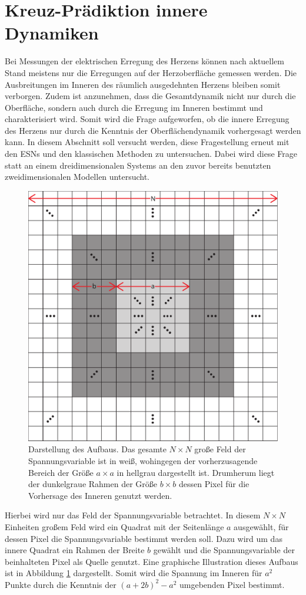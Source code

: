 \clearpage
\section{Kreuz-Prädiktion innere Dynamiken}
\label{sec:exp_inner_prediction}
Bei Messungen der elektrischen Erregung des Herzens können nach aktuellem Stand meistens nur die Erregungen auf der Herzoberfläche gemessen werden. Die Ausbreitungen im Inneren des räumlich ausgedehnten Herzens bleiben somit verborgen. Zudem ist anzunehmen, dass die Gesamtdynamik nicht nur durch die Oberfläche, sondern auch durch die Erregung im Inneren bestimmt und charakterisiert wird. Somit wird die Frage aufgeworfen, ob die innere Erregung des Herzens nur durch die Kenntnis der Oberflächendynamik vorhergesagt werden kann. In diesem Abschnitt soll versucht werden, diese Fragestellung erneut mit den \textsc{ESN}s und den klassischen Methoden zu untersuchen. Dabei wird diese Frage statt an einem dreidimensionalen Systems an den zuvor bereits benutzten zweidimensionalen Modellen untersucht.\\

\begin{figure}[h]
	\centering
	\includegraphics[width=.6\linewidth]{figures/illustrations/inner_prediction.pdf}
	\caption{Darstellung des Aufbaus. Das gesamte $N \times N$ große Feld der Spannungsvariable ist in weiß, wohingegen der vorherzusagende Bereich der Größe $a \times a$ in hellgrau dargestellt ist. Drumherum liegt der dunkelgraue Rahmen der Größe $b \times b$ dessen Pixel für die Vorhersage des Inneren genutzt werden.}
	\label{fig:exp_inner_prediction}
\end{figure}

Hierbei wird nur das Feld der Spannungsvariable betrachtet. In diesem $N \times N$ Einheiten großem Feld wird ein Quadrat mit der Seitenlänge $a$ ausgewählt, für dessen Pixel die Spannungsvariable bestimmt werden soll. Dazu wird um das innere Quadrat ein Rahmen der Breite $b$ gewählt und die Spannungsvariable der beinhalteten Pixel als Quelle genutzt. Eine graphische Illustration dieses Aufbaus ist in Abbildung \ref{fig:exp_inner_prediction} dargestellt. Somit wird die Spannung im Inneren für $a^2$ Punkte durch die Kenntnis der $(a+2b)^2-a^2$ umgebenden Pixel bestimmt.\\

